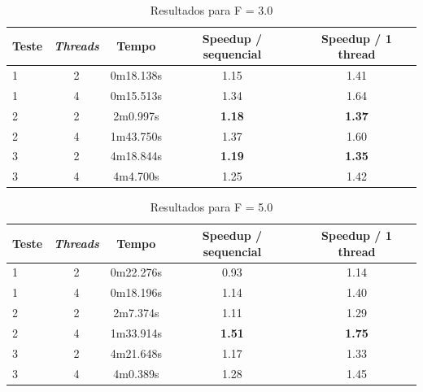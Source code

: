 \documentclass[12pt]{article}
\begin{document}
\begin{table}[H]
  \begin{center}
    \begin{tabular}{ | l | c | c | c | c |}
      \hline
      \textbf{Teste} & \textbf{\textit{Threads}} & \textbf{Tempo} & \textbf{Speedup / sequencial} & \textbf{Speedup / 1 thread}\\ \hline
      1 & 2 & 0m18.138s & 1.15 & 1.41 \\ \hline
      1 & 4 & 0m15.513s & 1.34 & 1.64 \\ \hline
      2 & 2 & 2m0.997s & \textbf{1.18} & \textbf{1.37} \\ \hline
      2 & 4 & 1m43.750s & 1.37 & 1.60 \\ \hline
      3 & 2 & 4m18.844s & \textbf{1.19} & \textbf{1.35} \\ \hline
      3 & 4 & 4m4.700s & 1.25 & 1.42 \\ \hline
  \end{tabular}
  \caption{Resultados para F = 3.0}
  \label{tbl:resultados3}
  \end{center}
\end{table}

\begin{table}[H]
  \begin{center}
    \begin{tabular}{ | l | c | c | c | c |}
      \hline
      \textbf{Teste} & \textbf{\textit{Threads}} & \textbf{Tempo} & \textbf{Speedup / sequencial} & \textbf{Speedup / 1 thread}\\ \hline
      1 & 2 & 0m22.276s & 0.93 & 1.14 \\ \hline
      1 & 4 & 0m18.196s & 1.14 & 1.40 \\ \hline
      2 & 2 & 2m7.374s & 1.11 & 1.29 \\ \hline
      2 & 4 & 1m33.914s & \textbf{1.51} & \textbf{1.75} \\ \hline
      3 & 2 & 4m21.648s & 1.17 & 1.33 \\ \hline
      3 & 4 & 4m0.389s & 1.28 & 1.45 \\ \hline
  \end{tabular}
  \caption{Resultados para F = 5.0}
  \label{tbl:resultados5}
  \end{center}
\end{table}
\end{document}
